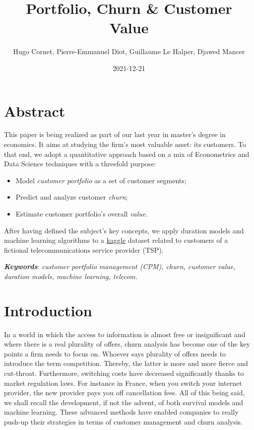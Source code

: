 \documentclass[
]{book}
\title{Portfolio, Churn \& Customer Value}
\author{Hugo Cornet, Pierre-Emmanuel Diot, Guillaume Le Halper, Djawed Mancer}
\date{2021-12-21}
\providecommand{\tightlist}{%
  \setlength{\itemsep}{0pt}\setlength{\parskip}{0pt}}
\begin{document}
\maketitle

{
\setcounter{tocdepth}{1}
\tableofcontents
}
\hypertarget{abstract}{%
\chapter*{Abstract}\label{abstract}}

This paper is being realized as part of our last year in master's degree in economics. It aims at studying the firm's most valuable asset: its customers. To that end, we adopt a quantitative approach based on a mix of Econometrics and Data Science techniques with a threefold purpose:

\begin{itemize}
\tightlist
\item
  Model \emph{customer portfolio} as a set of customer segments;
\item
  Predict and analyze customer \emph{churn};
\item
  Estimate customer portfolio's overall \emph{value}.
\end{itemize}

After having defined the subject's key concepts, we apply duration models and machine learning algorithms to a \href{https://www.kaggle.com/yeanzc/telco-customer-churn-ibm-dataset}{kaggle} dataset related to customers of a fictional telecommunications service provider (TSP).

\textbf{\emph{Keywords}}: \emph{customer portfolio management (CPM), churn, customer value, duration models, machine learning, telecom.}

\hypertarget{intro}{%
\chapter{Introduction}\label{intro}}

In a world in which the access to information is almost free or insignificant and where there is a real plurality of offers, churn analysis has become one of the key points a firm needs to focus on. Whoever says plurality of offers needs to introduce the term competition. Thereby, the latter is more and more fierce and cut-throat. Furthermore, switching costs have decreased significantly thanks to market regulation laws. For instance in France, when you switch your internet provider, the new provider pays you off cancellation fees. All of this being said, we shall recall the development, if not the advent, of both survival models and machine learning. These advanced methods have enabled companies to really push-up their strategies in terms of customer management and churn analysis.
\end{document}
